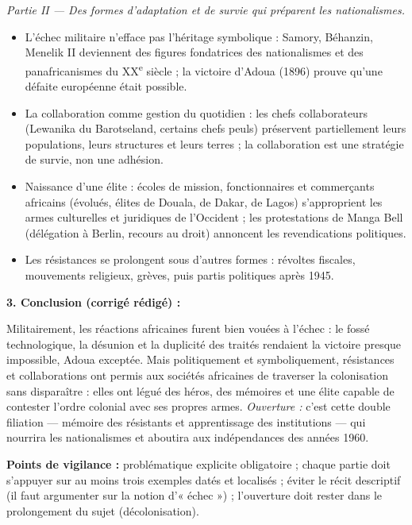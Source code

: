 \documentclass[11pt]{article}
\begin{document}
\begin{corrige}
\emph{Partie II — Des formes d'adaptation et de survie qui préparent les nationalismes.}
\begin{itemize}
    \item L'échec militaire n'efface pas l'héritage symbolique : Samory, Béhanzin, Menelik II deviennent des figures fondatrices des nationalismes et des panafricanismes du XX\textsuperscript{e} siècle ; la victoire d'Adoua (1896) prouve qu'une défaite européenne était possible.
    \item La collaboration comme gestion du quotidien : les chefs collaborateurs (Lewanika du Barotseland, certains chefs peuls) préservent partiellement leurs populations, leurs structures et leurs terres ; la collaboration est une stratégie de survie, non une adhésion.
    \item Naissance d'une élite : écoles de mission, fonctionnaires et commerçants africains (évolués, élites de Douala, de Dakar, de Lagos) s'approprient les armes culturelles et juridiques de l'Occident ; les protestations de Manga Bell (délégation à Berlin, recours au droit) annoncent les revendications politiques.
    \item Les résistances se prolongent sous d'autres formes : révoltes fiscales, mouvements religieux, grèves, puis partis politiques après 1945.
\end{itemize}

\textbf{3. Conclusion (corrigé rédigé) :}

Militairement, les réactions africaines furent bien vouées à l'échec : le fossé technologique, la désunion et la duplicité des traités rendaient la victoire presque impossible, Adoua exceptée. Mais politiquement et symboliquement, résistances et collaborations ont permis aux sociétés africaines de traverser la colonisation sans disparaître : elles ont légué des héros, des mémoires et une élite capable de contester l'ordre colonial avec ses propres armes. \emph{Ouverture :} c'est cette double filiation — mémoire des résistants et apprentissage des institutions — qui nourrira les nationalismes et aboutira aux indépendances des années 1960.

\textbf{Points de vigilance :} problématique explicite obligatoire ; chaque partie doit s'appuyer sur au moins trois exemples datés et localisés ; éviter le récit descriptif (il faut argumenter sur la notion d'« échec ») ; l'ouverture doit rester dans le prolongement du sujet (décolonisation).
\end{corrige}
\end{document}
